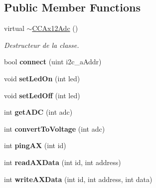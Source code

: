 \subsection*{Public Member Functions}
\begin{DoxyCompactItemize}
\item 
\mbox{\label{classCCAx12Adc_a9eae943748844e490af64c385d7cc1e7}} 
virtual \hyperlink{classCCAx12Adc_a9eae943748844e490af64c385d7cc1e7}{$\sim$\+C\+C\+Ax12\+Adc} ()
\begin{DoxyCompactList}\small\item\em Destructeur de la classe. \end{DoxyCompactList}\item 
\mbox{\label{classCCAx12Adc_a55da96298954f4bd09483a3fc40af768}} 
bool {\bfseries connect} (uint i2c\+\_\+a\+Addr)
\item 
\mbox{\label{classCCAx12Adc_a85d21062dfabb83ba1851341464e4ceb}} 
void {\bfseries set\+Led\+On} (int led)
\item 
\mbox{\label{classCCAx12Adc_af2c5e8ac33096b2316d35aad400e3585}} 
void {\bfseries set\+Led\+Off} (int led)
\item 
\mbox{\label{classCCAx12Adc_ad83f5d15bd8068ee822b2d5860f3f0f3}} 
int {\bfseries get\+A\+DC} (int adc)
\item 
\mbox{\label{classCCAx12Adc_a0c115e78034fdef80dad1466f1137442}} 
int {\bfseries convert\+To\+Voltage} (int adc)
\item 
\mbox{\label{classCCAx12Adc_ab26fb446defd5a6fb4c0695a2834bb57}} 
int {\bfseries ping\+AX} (int id)
\item 
\mbox{\label{classCCAx12Adc_af95b4426fbb54ee143cbe5000d0ca5d8}} 
int {\bfseries read\+A\+X\+Data} (int id, int address)
\item 
\mbox{\label{classCCAx12Adc_a6a505e9a0944b62ec52f59a9ec8085fe}} 
int {\bfseries write\+A\+X\+Data} (int id, int address, int data)
\item 
\mbox{\label{classCCAx12Adc_a8d4836cc205f0e332409c73337561460}} 

\end{DoxyCompactItemize}

